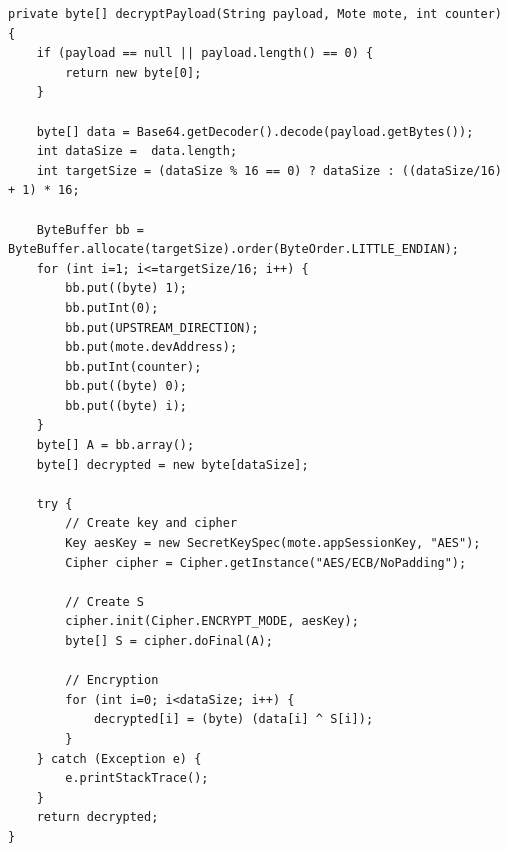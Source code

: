 \begin{lstlisting}[caption=decryptPayload() in ApplicationServerHandler.java\label{list:decrypt}]
private byte[] decryptPayload(String payload, Mote mote, int counter) {
    if (payload == null || payload.length() == 0) {
        return new byte[0];
    }

    byte[] data = Base64.getDecoder().decode(payload.getBytes());
    int dataSize =  data.length;
    int targetSize = (dataSize % 16 == 0) ? dataSize : ((dataSize/16) + 1) * 16;

    ByteBuffer bb = ByteBuffer.allocate(targetSize).order(ByteOrder.LITTLE_ENDIAN);
    for (int i=1; i<=targetSize/16; i++) {
        bb.put((byte) 1);
        bb.putInt(0);
        bb.put(UPSTREAM_DIRECTION);
        bb.put(mote.devAddress);
        bb.putInt(counter);
        bb.put((byte) 0);
        bb.put((byte) i);
    }
    byte[] A = bb.array();
    byte[] decrypted = new byte[dataSize];

    try {
        // Create key and cipher
        Key aesKey = new SecretKeySpec(mote.appSessionKey, "AES");
        Cipher cipher = Cipher.getInstance("AES/ECB/NoPadding");

        // Create S
        cipher.init(Cipher.ENCRYPT_MODE, aesKey);
        byte[] S = cipher.doFinal(A);

        // Encryption
        for (int i=0; i<dataSize; i++) {
            decrypted[i] = (byte) (data[i] ^ S[i]);
        }
    } catch (Exception e) {
        e.printStackTrace();
    }
    return decrypted;
}
\end{lstlisting}
